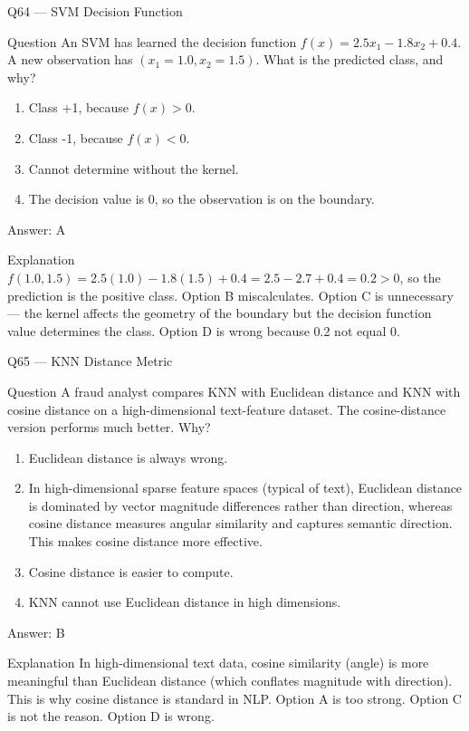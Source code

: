 \documentclass[aspectratio=169,8pt]{beamer}
\begin{document}
	\begin{frame}{Q64 --- SVM Decision Function}
		\begin{block}{Question}
			An SVM has learned the decision function $f(x) = 2.5 x_1 - 1.8 x_2 + 0.4$. A new observation has $(x_1 = 1.0, x_2 = 1.5)$. What is the predicted class, and why?
		\end{block}
		\begin{enumerate}
			\item Class +1, because $f(x) > 0$.
			\item Class -1, because $f(x) < 0$.
			\item Cannot determine without the kernel.
			\item The decision value is 0, so the observation is on the boundary.
		\end{enumerate}
		\begin{exampleblock}{Answer: A}\end{exampleblock}
		\begin{block}{Explanation}
			$f(1.0, 1.5) = 2.5(1.0) - 1.8(1.5) + 0.4 = 2.5 - 2.7 + 0.4 = 0.2 > 0$, so the prediction is the positive class. Option B miscalculates. Option C is unnecessary --- the kernel affects the geometry of the boundary but the decision function value determines the class. Option D is wrong because 0.2 not equal 0.
		\end{block}
	\end{frame}
	
	\begin{frame}{Q65 --- KNN Distance Metric}
		\begin{block}{Question}
			A fraud analyst compares KNN with Euclidean distance and KNN with cosine distance on a high-dimensional text-feature dataset. The cosine-distance version performs much better. Why?
		\end{block}
		\begin{enumerate}
			\item Euclidean distance is always wrong.
			\item In high-dimensional sparse feature spaces (typical of text), Euclidean distance is dominated by vector magnitude differences rather than direction, whereas cosine distance measures angular similarity and captures semantic direction. This makes cosine distance more effective.
			\item Cosine distance is easier to compute.
			\item KNN cannot use Euclidean distance in high dimensions.
		\end{enumerate}
		\begin{exampleblock}{Answer: B}\end{exampleblock}
		\begin{block}{Explanation}
			In high-dimensional text data, cosine similarity (angle) is more meaningful than Euclidean distance (which conflates magnitude with direction). This is why cosine distance is standard in NLP. Option A is too strong. Option C is not the reason. Option D is wrong.
		\end{block}
	\end{frame}
	
\end{document}

